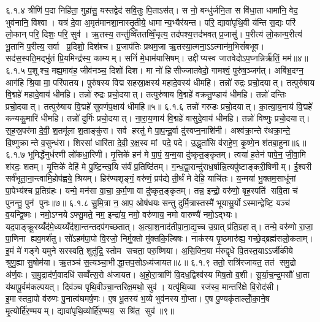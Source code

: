 ६.१.४
त्रीणि॑ प॒दा निहि॑ता॒ गुहा॑सु॒ यस्तद्वेद॑ सवि॒तुः पि॒ताऽस॑त्। स नो॒ बन्धु॑र्जनि॒ता स वि॑धा॒ता धामा॑नि॒ वेद॒ भुव॑नानि॒ विश्वा। यत्र॑ दे॒वा अ॒मृत॑मानशा॒नास्तृ॒तीये॒ धामान्य॒भ्यैर॑यन्त। परि॒ द्यावा॑पृथि॒वी य॑न्ति स॒द्यः परि॑ लो॒कान् परि॒ दिशः॒ परि॒ सुव॑। ऋ॒तस्य॒ तन्तु॑व्विँततव्विँ॒चृत्य॒ तद॑पश्य॒त्तद॑भवत् प्र॒जासु॑। प॒रीत्य॑ लो॒कान्प॒रीत्य॑ भू॒तानि॑ प॒रीत्य॒ सर्वा प्र॒दिशो॒ दिश॑श्च। प्र॒जाप॑तिः प्रथम॒जा ऋ॒तस्या॒त्मना॒ऽऽत्मान॑म॒भिसं॑बभूव। सद॑स॒स्पति॒मद्भु॑तं प्रि॒यमिन्द्र॑स्य॒ काम्यम्। सनिं॑ मे॒धाम॑यासिषम्। उद्दीप्यस्व जातवेदोऽप॒घ्नन्निर्\mbox{}ऋ॑तिं॒ मम॑॥४॥
६.१.५
प॒शूश्च॒ मह्य॒माव॑ह॒ जीव॑नञ्च॒ दिशो॑ दिश। मा नो॑ हिसीज्जातवेदो॒ गामश्वं॒ पुरु॑ष॒ञ्जग॑त्। अबि॑भ्र॒दग्न॒ आग॑हि श्रि॒या मा॒ परि॑पातय। पुरु॑षस्य विद्म सहस्रा॒क्षस्य॑ महादे॒वस्य॑ धीमहि। तन्नो॑ रुद्रः प्रचो॒दयात्। तत्पुरु॑षाय वि॒द्महे॑ महादे॒वाय॑ धीमहि। तन्नो॑ रुद्रः प्रचो॒दयात्। तत्पुरु॑षाय वि॒द्महे॑ वक्रतु॒ण्डाय॑ धीमहि। तन्नो॑ दन्तिः प्रचो॒दयात्। तत्पुरु॑षाय वि॒द्महे॑ सुवर्णप॒क्षाय॑ धीमहि॥५॥
६.१.६
तन्नो॑ गरुडः प्रचो॒दयात्। का॒त्या॒य॒नाय॑ वि॒द्महे॑ कन्यकु॒मारि॑ धीमहि। तन्नो॑ दुर्गिः प्रचो॒दयात्। ना॒रा॒य॒णाय॑ वि॒द्महे॑ वासुदे॒वाय॑ धीमहि। तन्नो॑ विष्णुः प्रचो॒दयात्। स॒ह॒स्र॒पर॑मा दे॒वी॒ श॒तमू॑ला श॒ताङ्कु॑रा। सर्व हरतु॑ मे पा॒प॒न्दू॒र्वा दु॑स्वप्न॒नाशि॑नी। अश्व॑क्रा॒न्ते र॑थक्रा॒न्ते॒ वि॒ष्णुक्रान्ते व॒सुन्ध॑रा। शिरसा॑ धारि॑ता दे॒वी॒ र॒क्ष॒स्व मां पदे॒ पदे। उ॒द्धृता॑सि व॑राहे॒ण॒ कृ॒ष्णे॒न श॑तबा॒हुना॥६॥
६.१.७
भूमिर्द्धेनुर्धरणी लो॑कधा॒रिणी। मृ॒त्तिके॑ हन॑ मे पा॒पं॒ य॒न्म॒या दु॑ष्कृत॒ङ्कृतम्। त्वया॑ ह॒तेन॑ पापे॒न॒ जी॒वा॒मि श॑रदः॒ शतम्। मृ॒त्तिके॑ देहि॑ मे पु॒ष्टि॒न्त्व॒यि स॑र्वं प्र॒तिष्ठि॑तम्। ग॒न्ध॒द्वा॒रान्दु॑राध॒र्\mbox{}षान्नि॒त्यपु॑ष्टाङ्करी॒षिणीम्। ई॒श्वरी सर्व॑भूता॒ना॒न्त्वामि॒होप॑ह्वये॒ श्रियम्। हिर॑ण्यशृङ्गं॒ वरु॑णं॒ प्रप॑द्ये ती॒र्थं मे देहि॒ याचि॑तः। य॒न्मया॑ भु॒क्तम॒साधू॑नां पा॒पेभ्य॑श्च प्र॒तिग्र॑हः। यन्मे॒ मन॑सा वा॒चा॒ क॒र्म॒णा वा दु॑ष्कृत॒ङ्कृतम्। तन्न॒ इन्द्रो॒ वरु॑णो॒ बृह॒स्पति॑ सवि॒ता च॑ पुनन्तु॒ पुन॑ पुनः॥७॥
६.१.८
सु॒मि॒त्रा न॒ आप॒ ओष॑धयः सन्तु दुर्मि॒त्रास्तस्मै॑ भूयासु॒र्योऽस्मान्द्वेष्टि॒ यञ्च॑ व॒यन्द्वि॒ष्मः। नमो॒ऽग्नयेऽफ्सु॒मते॒ नम॒ इन्द्रा॑य॒ नमो॒ वरु॑णाय॒ नमो वारुण्यै॑ नमो॒ऽद्भ्यः। यद॒पाङ्क्रू॒रय्यँद॑मे॒ध्यय्यँद॑शा॒न्तन्तदप॑गच्छतात्। अ॒त्या॒श॒नाद॑तीपा॒ना॒द्य॒च्च उ॒ग्रात् प्र॑ति॒ग्रहात्। तन्मे॒ वरु॑णो रा॒जा॒ पा॒णिना ह्यव॒मर्\mbox{}श॑तु। सो॑ऽहम॑पा॒पो वि॒रजो॒ निर्मु॒क्तो मु॑क्तकि॒ल्बिषः। नाक॑स्य पृ॒ष्ठमारु॑ह्य॒ गच्छे॒द्ब्रह्म॑सलो॒कताम्। इ॒मं मे॑ गङ्गे यमुने सरस्वति॒ शुतु॑द्रि॒ स्तोम सचता॒ परु॒ष्णिया। अ॒सि॒क्नि॒या म॑रुद्वृधे वि॒तस्त॒याऽऽर्जी॑कीये श्रुणु॒ह्या सु॒षोम॑या। ऋ॒तञ्च॑ स॒त्यञ्चा॒भीद्धा॒त्तप॒सोऽध्य॑जायत॥८॥
६.१.९
ततो॒ रात्रि॑रजायत॒ तत॑ समु॒द्रो अ॑र्ण॒वः। स॒मु॒द्राद॑र्ण॒वादधि॑ सव्वँत्स॒रो अ॑जायत। अ॒हो॒रा॒त्राणि॑ वि॒दध॒द्विश्व॑स्य मिष॒तो व॒शी। सू॒र्या॒च॒न्द्र॒मसौ॑ धा॒ता य॑थापू॒र्वम॑कल्पयत्। दिव॑ञ्च पृथि॒वीञ्चा॒न्तरि॑क्ष॒मथो॒ सुव॑। यत्पृ॑थि॒व्या रज॑स्व॒ मान्तरि॑क्षे वि॒रोद॑सी। इ॒मास्तदा॒पो व॑रुणः पु॒नात्व॑घमर्\mbox{}ष॒णः। ए॒ष भू॒तस्य॑ भ॒व्ये भुव॑नस्य गो॒प्ता। ए॒ष पु॒ण्यकृ॑ताल्लोँ॒का॒ने॒ष मृ॒त्योर्\mbox{}हि॑र॒ण्मयम्। द्यावा॑पृथि॒व्योर्\mbox{}हि॑र॒ण्मय॒ सश्रि॑त॒ सुव॑॥९॥
